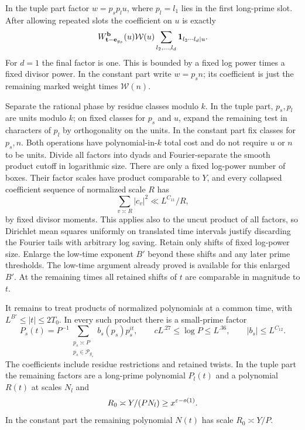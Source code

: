 In the tuple part factor $w=p_sp_lu$, where $p_l=l_1$ lies in the
first long-prime slot.  After allowing repeated slots the coefficient
on $u$ is exactly
\begin{equation}\label{cor:u-coefficient}
 W_{\mathbf t-\mathbf e_{g_s}}^{\mathbf b}(u)\mathcal W(u)
       \sum_{l_2,\ldots,l_d}\mathbf{1}_{l_2\cdots l_d\mid u}.
\end{equation}
For $d=1$ the final factor is one.  This is bounded by a fixed log
power times a fixed divisor power.  In the constant part write
$w=p_sn$; its coefficient is just the remaining marked weight times
$\mathcal W(n)$.

Separate the rational phase by residue classes modulo $k$.  In the
tuple part, $p_s,p_l$ are units modulo $k$; on fixed classes for $p_s$
and $u$, expand the remaining test in characters of $p_l$ by
orthogonality on the units.  In the constant part fix classes for
$p_s,n$.  Both operations have polynomial-in-$k$ total cost and do
not require $u$ or $n$ to be units.  Divide all factors into dyads and
Fourier-separate the smooth product cutoff in logarithmic size.
There are only a fixed log-power number of boxes.  Their factor scales
have product comparable to $Y$, and every collapsed coefficient
sequence of normalized scale $R$ has
\begin{equation}\label{cor:collapsed-coefficients}
 \sum_{v\asymp R}|c_v|^2\ll L^{C_{11}}/R,
\end{equation}
by fixed divisor moments.  This applies also to the uncut product of
all factors, so Dirichlet mean squares uniformly on translated time
intervals justify discarding the Fourier tails with arbitrary log
saving.  Retain only shifts of fixed log-power size.  Enlarge the
low-time exponent $B'$ beyond these shifts and any later prime
thresholds.  The low-time argument already proved is available for
this enlarged $B'$.  At the remaining times all retained shifts of $t$
are comparable in magnitude to $t$.

It remains to treat products of normalized polynomials at a common
time, with $L^{B'}\leq|t|\leq2T_0$.  In every such product there is
a small-prime factor
\begin{equation}\label{cor:small-polynomial}
 P_s(t)=P^{-1}\sum_{\substack{p_s\asymp P\\p_s\in\mathcal P_{g_s}}}
            b_s(p_s)p_s^{it},\qquad
 cL^{.27}\leq\log P\leq L^{.36},\qquad |b_s|\leq L^{C_{12}}.
\end{equation}
The coefficients include residue restrictions and retained twists.
In the tuple part the remaining factors are a long-prime polynomial
$P_l(t)$ and a polynomial $R(t)$ at scales $N_l$ and
\begin{equation}\label{cor:remaining-scale}
 R_0\asymp Y/(PN_l)\geq x^{\varepsilon-o(1)}.
\end{equation}
In the constant part the remaining polynomial $N(t)$ has scale
$R_0\asymp Y/P$.

